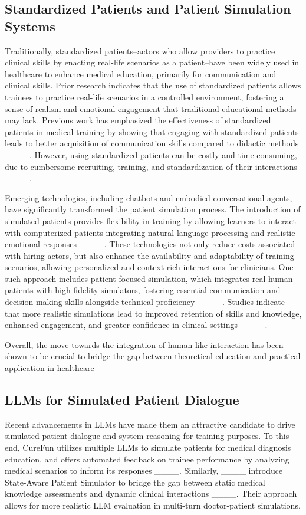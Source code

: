 \subsection{Standardized Patients and Patient Simulation Systems}
Traditionally, standardized patients--actors who allow providers to practice clinical skills by enacting real-life scenarios as a patient--have been widely used in healthcare to enhance medical education, primarily for communication and clinical skills. Prior research indicates that the use of standardized patients allows trainees to practice real-life scenarios in a controlled environment, fostering a sense of realism and emotional engagement that traditional educational methods may lack. Previous work has emphasized the effectiveness of standardized patients in medical training by showing that engaging with standardized patients leads to better acquisition of communication skills compared to didactic methods ____. However, using standardized patients can be costly and time consuming, due to cumbersome recruiting, training, and standardization of their interactions ____.

Emerging technologies, including chatbots and embodied conversational agents, have significantly transformed the patient simulation process. The introduction of simulated patients provides flexibility in training by allowing learners to interact with computerized patients integrating natural language processing and realistic emotional responses ____. These technologies not only reduce costs associated with hiring actors, but also enhance the availability and adaptability of training scenarios, allowing personalized and context-rich interactions for clinicians. One such approach includes patient-focused simulation, which integrates real human patients with high-fidelity simulators, fostering essential communication and decision-making skills alongside technical proficiency ____. Studies indicate that more realistic simulations lead to improved retention of skills and knowledge, enhanced engagement, and greater confidence in clinical settings ____.  

Overall, the move towards the integration of human-like interaction has been shown to be crucial to bridge the gap between theoretical education and practical application in healthcare  ____

\subsection{LLMs for Simulated Patient Dialogue}
Recent advancements in LLMs have made them an attractive candidate to drive simulated patient dialogue and system reasoning for training purposes. To this end, CureFun utilizes multiple LLMs to simulate patients for medical diagnosis education, and offers automated feedback on trainee performance by analyzing medical scenarios to inform its responses ____. Similarly, ____ introduce State-Aware Patient Simulator to bridge the gap between static medical knowledge assessments and dynamic clinical interactions ____. Their approach allows for more realistic LLM evaluation in multi-turn doctor-patient simulations.


